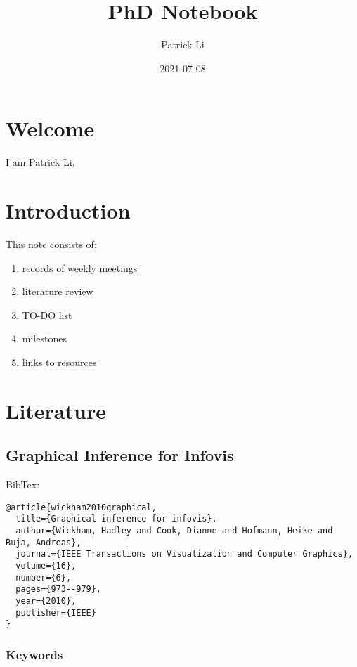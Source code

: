 \documentclass[
]{book}
\title{PhD Notebook}
\author{Patrick Li}
\date{2021-07-08}
\providecommand{\tightlist}{%
  \setlength{\itemsep}{0pt}\setlength{\parskip}{0pt}}
\begin{document}
\maketitle

{
\setcounter{tocdepth}{1}
\tableofcontents
}
\hypertarget{welcome}{%
\chapter{Welcome}\label{welcome}}

I am Patrick Li.

\hypertarget{introduction}{%
\chapter{Introduction}\label{introduction}}

This note consists of:

\begin{enumerate}
\def\labelenumi{\arabic{enumi}.}
\tightlist
\item
  records of weekly meetings
\item
  literature review
\item
  TO-DO list
\item
  milestones
\item
  links to resources
\end{enumerate}

\hypertarget{literature}{%
\chapter{Literature}\label{literature}}

\hypertarget{graphical-inference-for-infovis}{%
\section{Graphical Inference for Infovis}\label{graphical-inference-for-infovis}}

BibTex:

\begin{verbatim}
@article{wickham2010graphical,
  title={Graphical inference for infovis},
  author={Wickham, Hadley and Cook, Dianne and Hofmann, Heike and Buja, Andreas},
  journal={IEEE Transactions on Visualization and Computer Graphics},
  volume={16},
  number={6},
  pages={973--979},
  year={2010},
  publisher={IEEE}
}
\end{verbatim}

\hypertarget{keywords}{%
\subsection{Keywords}\label{keywords}}
\end{document}
